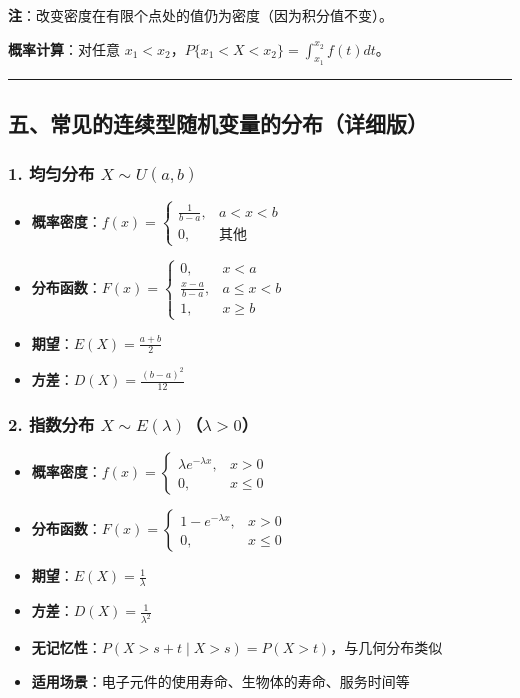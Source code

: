\documentclass[12pt,a4paper]{ctexart}
\begin{document}
\textbf{注}：改变密度在有限个点处的值仍为密度（因为积分值不变）。

\textbf{概率计算}：对任意 $x_1 < x_2$，$P\{x_1 < X < x_2\} = \int_{x_1}^{x_2} f(t) dt$。

\vspace{1em}\hrule\vspace{1em}

\subsection{五、常见的连续型随机变量的分布（详细版）}

\subsubsection{1. 均匀分布 $X \sim U(a, b)$}
\begin{itemize}[noitemsep]
    \item \textbf{概率密度}：$f(x) = \begin{cases} \frac{1}{b-a}, & a < x < b \\ 0, & \text{其他} \end{cases}$
    \item \textbf{分布函数}：$F(x) = \begin{cases} 0, & x < a \\ \frac{x-a}{b-a}, & a \le x < b \\ 1, & x \ge b \end{cases}$
    \item \textbf{期望}：$E(X) = \frac{a+b}{2}$
    \item \textbf{方差}：$D(X) = \frac{(b-a)^2}{12}$
\end{itemize}

\subsubsection{2. 指数分布 $X \sim E(\lambda)$（$\lambda > 0$）}
\begin{itemize}[noitemsep]
    \item \textbf{概率密度}：$f(x) = \begin{cases} \lambda e^{-\lambda x}, & x > 0 \\ 0, & x \le 0 \end{cases}$
    \item \textbf{分布函数}：$F(x) = \begin{cases} 1 - e^{-\lambda x}, & x > 0 \\ 0, & x \le 0 \end{cases}$
    \item \textbf{期望}：$E(X) = \frac{1}{\lambda}$
    \item \textbf{方差}：$D(X) = \frac{1}{\lambda^2}$
    \item \textbf{无记忆性}：$P(X > s+t \mid X > s) = P(X > t)$，与几何分布类似
    \item \textbf{适用场景}：电子元件的使用寿命、生物体的寿命、服务时间等
\end{itemize}
\end{document}
